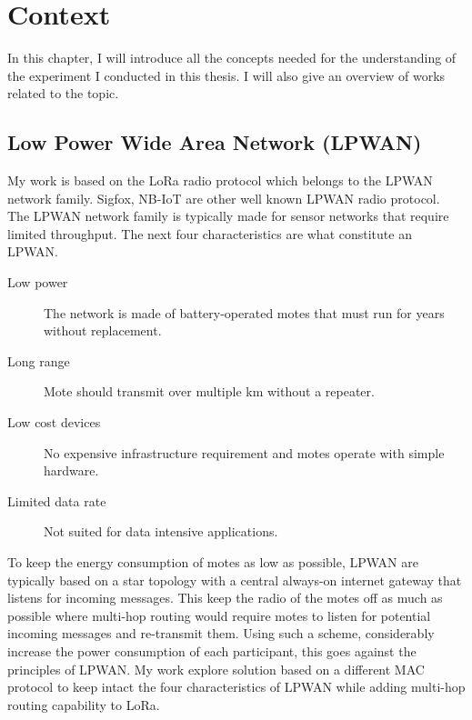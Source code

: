 \chapter{Context\label{section:context}}

In this chapter, I will introduce all the concepts needed for the understanding
of the experiment I conducted in this thesis.
I will also give an overview of works related to the topic.

\section{Low Power Wide Area Network (LPWAN)\label{section:lpwan}}

My work is based on the LoRa radio protocol which belongs to the LPWAN network
family.
Sigfox, NB-IoT are other well known LPWAN radio protocol.
The LPWAN network family is typically made for sensor networks that require
limited throughput.
The next four characteristics are what constitute an LPWAN.

\begin{description}
  \item[Low power] The network is made of battery-operated
    motes that must run for years without replacement.
  \item[Long range] Mote should transmit over multiple km without a repeater.
  \item[Low cost devices] No expensive infrastructure requirement and motes
    operate with simple hardware.
  \item[Limited data rate] Not suited for data intensive applications.
\end{description}

To keep the energy consumption of motes as low as possible, LPWAN are typically
based on a star topology with a central always-on internet gateway that listens
for incoming messages.
This keep the radio of the motes off as much as possible where multi-hop routing
would require motes to listen for potential incoming messages and
re-transmit them.
Using such a scheme, considerably increase the power consumption of each
participant, this goes against the principles of LPWAN.
My work explore solution based on a different MAC protocol to keep intact the
four characteristics of LPWAN while adding multi-hop routing capability to LoRa.

\paragraph{}

